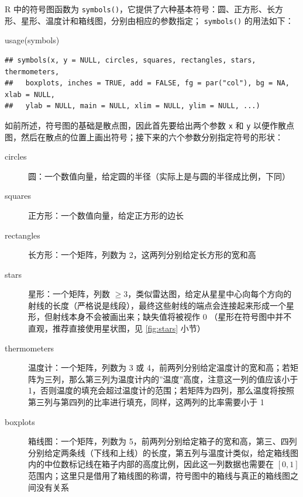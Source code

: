 \documentclass[
  b5paper,
  UTF8,twoside]{book}
\newenvironment{Shaded}{\begin{snugshade}}{\end{snugshade}}
\newcommand{\FunctionTok}[1]{\textcolor[rgb]{0.00,0.00,0.00}{#1}}
\newcommand{\NormalTok}[1]{#1}
\begin{document}
R 中的符号图函数为 \texttt{symbols()}，它提供了六种基本符号：圆、正方形、长方形、星形、温度计和箱线图，分别由相应的参数指定； \texttt{symbols()} 的用法如下：

\begin{Shaded}
\begin{Highlighting}[]
\FunctionTok{usage}\NormalTok{(symbols)}
\end{Highlighting}
\end{Shaded}

\begin{verbatim}
## symbols(x, y = NULL, circles, squares, rectangles, stars, thermometers,
##   boxplots, inches = TRUE, add = FALSE, fg = par("col"), bg = NA, xlab = NULL,
##   ylab = NULL, main = NULL, xlim = NULL, ylim = NULL, ...)
\end{verbatim}

如前所述，符号图的基础是散点图，因此首先要给出两个参数 \texttt{x} 和 \texttt{y} 以便作散点图，然后在散点的位置上画出符号；接下来的六个参数分别指定符号的形状：

\begin{description}
\item[circles]
圆：一个数值向量，给定圆的半径（实际上是与圆的半径成比例，下同）
\item[squares]
正方形：一个数值向量，给定正方形的边长
\item[rectangles]
长方形：一个矩阵，列数为 2，这两列分别给定长方形的宽和高
\item[stars]
星形：一个矩阵，列数 \(\geq3\)，类似雷达图，给定从星星中心向每个方向的射线的长度（严格说是线段），最终这些射线的端点会连接起来形成一个星形，但射线本身不会被画出来；缺失值将被视作 0 （星形在符号图中并不直观，推荐直接使用星状图，见 \ref{fig:stars} 小节）
\item[thermometers]
温度计：一个矩阵，列数为 3 或 4，前两列分别给定温度计的宽和高；若矩阵为三列，那么第三列为温度计内的''温度''高度，注意这一列的值应该小于 1，否则温度的填充会超过温度计的范围；若矩阵为四列，那么温度将按照第三列与第四列的比率进行填充，同样，这两列的比率需要小于 1
\item[boxplots]
箱线图：一个矩阵，列数为 5，前两列分别给定箱子的宽和高，第三、四列分别给定两条线（下线和上线）的长度，第五列与温度计类似，给定箱线图内的中位数标记线在箱子内部的高度比例，因此这一列数据也需要在 \([0,1]\) 范围内；这里只是借用了箱线图的称谓，符号图中的箱线与真正的箱线图之间没有关系
\end{description}
\end{document}
